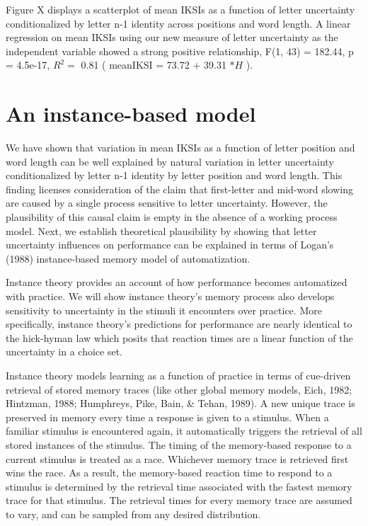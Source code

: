 \documentclass[floatsintext,man]{apa6}
\theoremstyle{definition}
\theoremstyle{definition}
\theoremstyle{definition}
\theoremstyle{remark}
\begin{document}
Figure X displays a scatterplot of mean IKSIs as a function of letter
uncertainty conditionalized by letter n-1 identity across positions and
word length. A linear regression on mean IKSIs using our new measure of
letter uncertainty as the independent variable showed a strong positive
relationship, F(1, 43) = 182.44, p = 4.5e-17, \(R^2 =\) 0.81 ( meanIKSI
= 73.72 \(+\) 39.31 \(* H\) ).

\section{An instance-based model}\label{an-instance-based-model}

We have shown that variation in mean IKSIs as a function of letter
position and word length can be well explained by natural variation in
letter uncertainty conditionalized by letter n-1 identity by letter
position and word length. This finding licenses consideration of the
claim that first-letter and mid-word slowing are caused by a single
process sensitive to letter uncertainty. However, the plausibility of
this causal claim is empty in the absence of a working process model.
Next, we establish theoretical plausibility by showing that letter
uncertainty influences on performance can be explained in terms of
Logan's (1988) instance-based memory model of automatization.

Instance theory provides an account of how performance becomes
automatized with practice. We will show instance theory's memory process
also develops sensitivity to uncertainty in the stimuli it encounters
over practice. More specifically, instance theory's predictions for
performance are nearly identical to the hick-hyman law which posits that
reaction times are a linear function of the uncertainty in a choice set.

Instance theory models learning as a function of practice in terms of
cue-driven retrieval of stored memory traces (like other global memory
models, Eich, 1982; Hintzman, 1988; Humphreys, Pike, Bain, \& Tehan,
1989). A new unique trace is preserved in memory every time a response
is given to a stimulus. When a familiar stimulus is encountered again,
it automatically triggers the retrieval of all stored instances of the
stimulus. The timing of the memory-based response to a current stimulus
is treated as a race. Whichever memory trace is retrieved first wins the
race. As a result, the memory-based reaction time to respond to a
stimulus is determined by the retrieval time associated with the fastest
memory trace for that stimulus. The retrieval times for every memory
trace are assumed to vary, and can be sampled from any desired
distribution.
\end{document}

